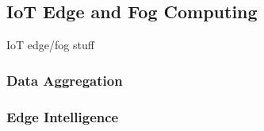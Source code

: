 \subsection{IoT Edge and Fog Computing}
IoT edge/fog stuff

\subsubsection{Data Aggregation}
\subsubsection{Edge Intelligence}
